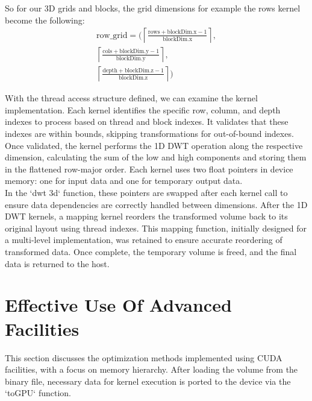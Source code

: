 \documentclass[journal,11pt]{IEEEtran}
\begin{document}
So for our 3D grids and blocks, the grid dimensions for example the rows kernel become the following:
\begin{equation}
    \begin{aligned}
        \text{row\_grid} = \Bigg( 
        \left\lceil \frac{\text{rows} + \text{blockDim.x} - 1}{\text{blockDim.x}} \right\rceil, \\
        \left\lceil \frac{\text{cols} + \text{blockDim.y} - 1}{\text{blockDim.y}} \right\rceil, \\
        \left\lceil \frac{\text{depth} + \text{blockDim.z} - 1}{\text{blockDim.z}} \right\rceil
        \Bigg)
    \end{aligned}
\end{equation}
 
With the thread access structure defined, we can examine the kernel implementation. Each kernel identifies the specific row, column, and depth indexes to process based on thread and block indexes. It validates that these indexes are within bounds, skipping transformations for out-of-bound indexes. Once validated, the kernel performs the 1D DWT operation along the respective dimension, calculating the sum of the low and high components and storing them in the flattened row-major order. Each kernel uses two float pointers in device memory: one for input data and one for temporary output data.\\

In the `dwt 3d` function, these pointers are swapped after each kernel call to ensure data dependencies are correctly handled between dimensions. After the 1D DWT kernels, a mapping kernel reorders the transformed volume back to its original layout using thread indexes. This mapping function, initially designed for a multi-level implementation, was retained to ensure accurate reordering of transformed data. Once complete, the temporary volume is freed, and the final data is returned to the host.

\section{Effective Use Of Advanced Facilities}

This section discusses the optimization methods implemented using CUDA facilities, with a focus on memory hierarchy. After loading the volume from the binary file, necessary data for kernel execution is ported to the device via the `toGPU` function.\\
\end{document}
